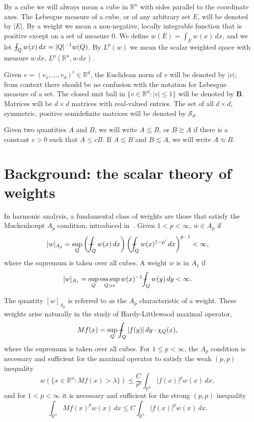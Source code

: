 \documentclass[12pt]{amsart}
\theoremstyle{definition}
\theoremstyle{remark}
\numberwithin{equation}{section}
\newcommand{\rn}{{{\mathbb R}^n}}
\newcommand{\rd}{{{\mathbb R}^d}}
\DeclareMathOperator*{\esssup}{ess\,sup}
\newcommand{\Sd}{\mathcal{S}_d}
\def\Xint#1{\mathchoice
   {\XXint\displaystyle\textstyle{#1}}%
   {\XXint\textstyle\scriptstyle{#1}}%
   {\XXint\scriptstyle\scriptscriptstyle{#1}}%
   {\XXint\scriptscriptstyle\scriptscriptstyle{#1}}%
   \!\int}
\def\XXint#1#2#3{{\setbox0=\hbox{$#1{#2#3}{\int}$}
     \vcenter{\hbox{$#2#3$}}\kern-.5\wd0}}
\def\avgint{\Xint-}
\begin{document}
By a cube we will always mean a cube in $\rn$ with sides parallel to
the coordinate axes.  The Lebesgue measure of a cube, or of any
arbitrary set $E$, will be denoted
by $|E|$.  By a weight we mean a non-negative, locally
integrable function that is positive except on a set of measure $0$.
We define $w(E) = \int_E w(x)\,dx$, and we let $\avgint_Q w(x)\,dx =
|Q|^{-1}w(Q)$.  By $L^p(w)$ we mean the scalar weighted space with
measure $w\,dx$, $L^p(\rn,w\,dx)$. 

Given $v=(v_1,\ldots,v_d)^t \in \rd $, the Euclidean norm of $v$ will
be denoted by $|v|$; from context there should be no confusion with
the notation for Lebesgue measure of a set.  The closed unit ball in
$\{ v \in \rd : |v| \leq 1\}$ will be denoted by ${\mathbf B}$.
Matrices will be $d\times d$ matrices with real-valued entries.  The
set of all $d\times d$, symmetric, positive semidefinite matrices will
be denoted by $\Sd$.

Given two quantities $A$ and $B$, we will write
$A \lesssim B$, or $B\gtrsim A$ if there is a constant $c>0$ such that
$A\leq cB$.  If $A\lesssim B$ and $B\lesssim A$, we will write
$A\approx B$.

 \section{Background: the scalar theory of weights}
 \label{section:scalar}

 In harmonic analysis, a fundamental class of weights are those that
 satisfy the Muckenhoupt $A_p$ condition, introduced
 in~\cite{muckenhoupt72}.  Given $1<p<\infty$, $w\in A_p$ if
%
\[ [w]_{A_p} = \sup_Q \left(\avgint_Q w(x)\,dx\right) \left(\avgint_Q
  w(x)^{1-p'}\,dx\right)^{p-1} < \infty, \]
%
where the supremum is taken over all cubes.  A weight $w$ is in $A_1$ if
%
\[ [w]_{A_1} = \sup_{Q} \esssup_{Q\ni x}  w(x)^{-1} \avgint_Q
w(y)\,dy < \infty. \]

The quantity $[w]_{A_p}$ is referred to as the $A_p$ characteristic of
a weight.  These weights arise naturally in the study of Hardy-Littlewood maximal
operator,
%
\[ Mf(x) = \sup_Q \avgint_Q |f(y)|\,dy \cdot \chi_Q(x), \]
%
where the supremum is taken over all cubes.  For $1\leq p<\infty$, the
$A_p$ condition is necessary and sufficient for the maximal operator
to satisfy the weak $(p,p)$ inequality
%
\[ w(\{ x\in \rn : Mf(x) > \lambda \})
  \leq
  \frac{C}{t^p} \int_\rn |f(x)|^p w(x)\,dx, \]
%
and for $1<p<\infty$ it is necessary and sufficient for the strong
$(p,p)$ inequality
%
\[ \int_\rn Mf(x)^p w(x)\,dx
  \leq
  C \int_\rn |f(x)|^p w(x)\,dx. \]
%
\end{document}
